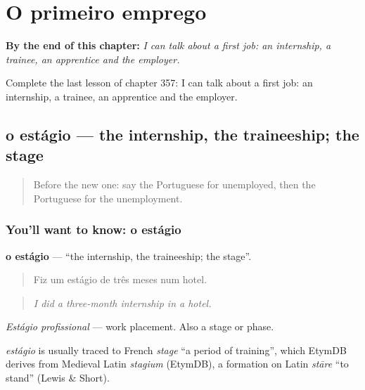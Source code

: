 
\chapter{O primeiro emprego}
\label{ch:pt-o-primeiro-emprego}

\begin{chapteropening}
\textbf{By the end of this chapter:} \emph{I can talk about a first job: an internship, a trainee, an apprentice and the employer.}

Complete the last lesson of chapter 357: I can talk about a first job: an internship, a trainee, an apprentice and the employer.
\end{chapteropening}

\section[o estágio]{o estágio — the internship, the traineeship; the stage}

\label{lesson:PT-C357-estagio}



\begin{quote}
Before the new one: say the Portuguese for unemployed, then the Portuguese for the unemployment.
\end{quote}

\subsection*{You'll want to know: o estágio}
\textbf{o estágio} — \textquotedblleft{}the internship, the traineeship; the stage\textquotedblright{}.

\begin{quote}
Fiz um estágio de três meses num hotel.
\end{quote}

\begin{quote}
\emph{I did a three-month internship in a hotel.}
\end{quote}

\emph{Estágio profissional} — work placement. Also a stage or phase.

\begin{cousinweb}
\emph{estágio} is usually traced to French \emph{stage} \textquotedblleft{}a period of training\textquotedblright{}, which EtymDB derives from Medieval Latin \emph{stagium} (EtymDB), a formation on Latin \emph{stāre} \textquotedblleft{}to stand\textquotedblright{} (Lewis \& Short).
\end{cousinweb}

